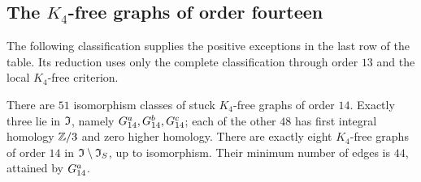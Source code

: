 \subsection{The \texorpdfstring{$K_4$}{K4}-free graphs of order fourteen}

The following classification supplies the positive exceptions in
the last row of the table. Its reduction uses only the complete
classification through order $13$ and the local $K_4$-free criterion.

\begin{theorem}\label{thm:classification14}
There are $51$ isomorphism classes of stuck $K_4$-free graphs of
order $14$. Exactly three lie in $\mathfrak I$, namely $G_{14}^{a},G_{14}^{b},G_{14}^{c}$;
each of the other $48$ has first integral homology $\mathbb Z/3$ and
zero higher homology. There are exactly eight $K_4$-free graphs
of order $14$ in $\mathfrak I\setminus\mathfrak I_S$, up to isomorphism. Their
minimum number of edges is $44$, attained by $G_{14}^{a}$.
\end{theorem}
